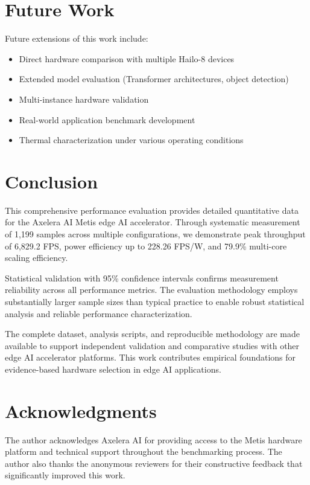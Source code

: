 \documentclass[journal]{IEEEtran}
\begin{document}
\section{Future Work}

Future extensions of this work include:
\begin{itemize}
    \item Direct hardware comparison with multiple Hailo-8 devices
    \item Extended model evaluation (Transformer architectures, object detection)
    \item Multi-instance hardware validation
    \item Real-world application benchmark development
    \item Thermal characterization under various operating conditions
\end{itemize}

\section{Conclusion}

This comprehensive performance evaluation provides detailed quantitative data for the Axelera AI Metis edge AI accelerator. Through systematic measurement of 1,199 samples across multiple configurations, we demonstrate peak throughput of 6,829.2 FPS, power efficiency up to 228.26 FPS/W, and 79.9\% multi-core scaling efficiency.

Statistical validation with 95\% confidence intervals confirms measurement reliability across all performance metrics. The evaluation methodology employs substantially larger sample sizes than typical practice to enable robust statistical analysis and reliable performance characterization.

The complete dataset, analysis scripts, and reproducible methodology are made available to support independent validation and comparative studies with other edge AI accelerator platforms. This work contributes empirical foundations for evidence-based hardware selection in edge AI applications.

\section*{Acknowledgments}

The author acknowledges Axelera AI for providing access to the Metis hardware platform and technical support throughout the benchmarking process. The author also thanks the anonymous reviewers for their constructive feedback that significantly improved this work.



\end{document}
